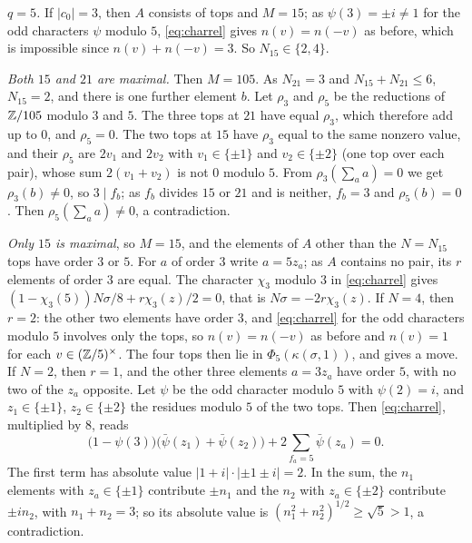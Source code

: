 \emph{$q=5$.} If $|c_{0}|=3$, then $A$ consists of tops and $M=15$; as
$\psi(3)=\pm i\ne1$ for the odd characters $\psi$ modulo $5$,
\eqref{eq:charrel} gives $n(v)=n(-v)$ as before, which is impossible since
$n(v)+n(-v)=3$. So $N_{15}\in\{2,4\}$.

\emph{Both $15$ and $21$ are maximal.} Then $M=105$. As $N_{21}=3$ and
$N_{15}+N_{21}\le6$, $N_{15}=2$, and there is one further element $b$. Let
$\rho_{3}$ and $\rho_{5}$ be the reductions of $\mathbb{Z}/105$ modulo $3$ and $5$.
The three tops at $21$ have equal $\rho_{3}$, which therefore add up to $0$,
and $\rho_{5}=0$. The two tops at $15$ have $\rho_{3}$ equal to the same
nonzero value, and their $\rho_{5}$ are $2v_{1}$ and $2v_{2}$ with
$v_{1}\in\{\pm1\}$ and $v_{2}\in\{\pm2\}$ (one top over each pair), whose
sum $2(v_{1}+v_{2})$ is not $0$ modulo $5$. From $\rho_{3}(\sum_{a}a)=0$ we
get $\rho_{3}(b)\ne0$, so $3\mid f_{b}$; as $f_{b}$ divides $15$ or $21$ and
is neither, $f_{b}=3$ and $\rho_{5}(b)=0$. Then $\rho_{5}(\sum_{a}a)\ne0$, a
contradiction.

\emph{Only $15$ is maximal}, so $M=15$, and the elements of $A$ other than
the $N=N_{15}$ tops have order $3$ or $5$. For $a$ of order $3$ write
$a=5z_{a}$; as $A$ contains no pair, its $r$ elements of order $3$ are
equal. The character $\chi_{3}$ modulo $3$ in \eqref{eq:charrel} gives
$(1-\chi_{3}(5))N\sigma/8+r\chi_{3}(z)/2=0$, that is
$N\sigma=-2r\chi_{3}(z)$. If $N=4$, then $r=2$: the other two elements have
order $3$, and \eqref{eq:charrel} for the odd characters modulo $5$ involves
only the tops, so $n(v)=n(-v)$ as before and $n(v)=1$ for each
$v\in(\mathbb{Z}/5)^{\times}$. The four tops then lie in
$\Phi_{5}(\kappa(\sigma,1))$, and  gives a move. If $N=2$,
then $r=1$, and the other three elements $a=3z_{a}$ have order $5$, with no
two of the $z_{a}$ opposite. Let $\psi$ be the odd character modulo $5$ with
$\psi(2)=i$, and $z_{1}\in\{\pm1\}$, $z_{2}\in\{\pm2\}$ the residues modulo
$5$ of the two tops. Then \eqref{eq:charrel}, multiplied by $8$, reads
\[
  \bigl(1-\psi(3)\bigr)\bigl(\bar\psi(z_{1})+\bar\psi(z_{2})\bigr)
  +2\sum_{f_{a}=5}\bar\psi(z_{a})=0.
\]
The first term has absolute value $|1+i|\cdot|{\pm1}\pm i|=2$. In the sum,
the $n_{1}$ elements with $z_{a}\in\{\pm1\}$ contribute $\pm n_{1}$ and the
$n_{2}$ with $z_{a}\in\{\pm2\}$ contribute $\pm in_{2}$, with
$n_{1}+n_{2}=3$; so its absolute value is $(n_{1}^{2}+n_{2}^{2})^{1/2}\ge
\sqrt5>1$, a contradiction.


